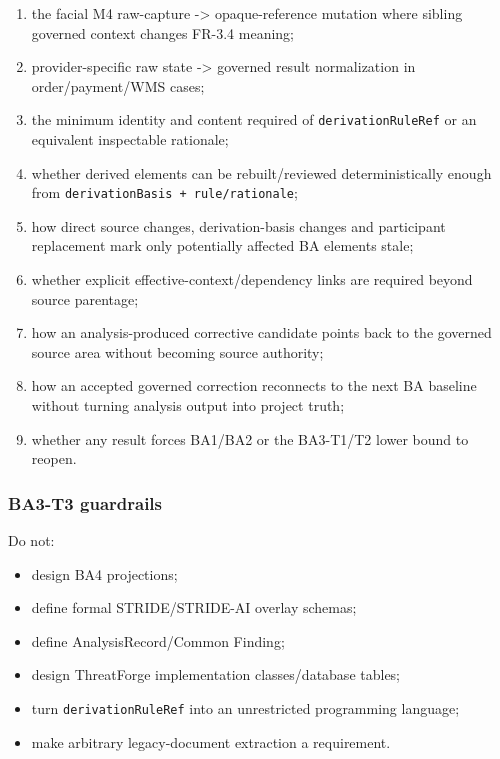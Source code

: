 \documentclass[11pt,a4paper]{article}
\providecommand{\tightlist}{\setlength{\itemsep}{0pt}\setlength{\parskip}{0pt}}\setlength{\emergencystretch}{4em}\hbadness=10000\hfuzz=20pt\sloppy
\begin{document}
\begin{enumerate}
\def\labelenumi{\arabic{enumi}.}
\tightlist
\item
  the facial M4 raw-capture -\textgreater{} opaque-reference mutation
  where sibling governed context changes FR-3.4 meaning;
\item
  provider-specific raw state -\textgreater{} governed result
  normalization in order/payment/WMS cases;
\item
  the minimum identity and content required of
  \texttt{derivationRuleRef} or an equivalent inspectable rationale;
\item
  whether derived elements can be rebuilt/reviewed deterministically
  enough from \texttt{derivationBasis\ +\ rule/rationale};
\item
  how direct source changes, derivation-basis changes and participant
  replacement mark only potentially affected BA elements stale;
\item
  whether explicit effective-context/dependency links are required
  beyond source parentage;
\item
  how an analysis-produced corrective candidate points back to the
  governed source area without becoming source authority;
\item
  how an accepted governed correction reconnects to the next BA baseline
  without turning analysis output into project truth;
\item
  whether any result forces BA1/BA2 or the BA3-T1/T2 lower bound to
  reopen.
\end{enumerate}

\subsubsection{BA3-T3 guardrails}\label{ba3-t3-guardrails}

Do not:

\begin{itemize}
\tightlist
\item
  design BA4 projections;
\item
  define formal STRIDE/STRIDE-AI overlay schemas;
\item
  define AnalysisRecord/Common Finding;
\item
  design ThreatForge implementation classes/database tables;
\item
  turn \texttt{derivationRuleRef} into an unrestricted programming
  language;
\item
  make arbitrary legacy-document extraction a requirement.
\end{itemize}
\end{document}
